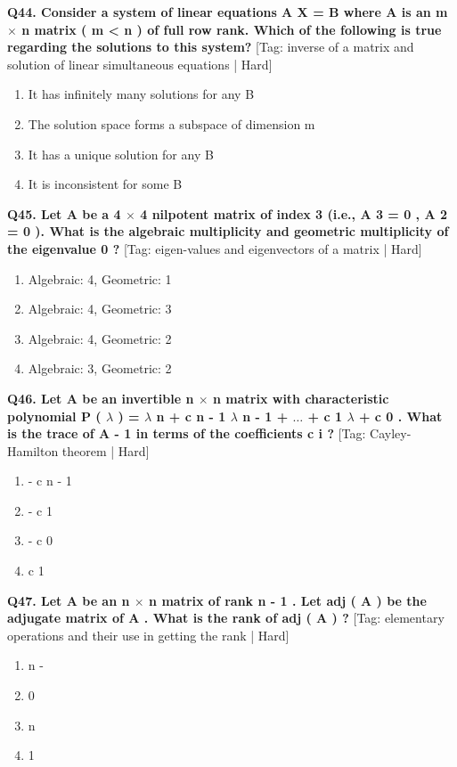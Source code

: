 \noindent\textbf{Q44. Consider a system of linear equations A X = B where A is an m $\times$ n matrix ( m < n ) of full row rank. Which of the following is true regarding the solutions to this system?} \hfill [Tag: inverse of a matrix and solution of linear simultaneous equations | Hard]
\begin{enumerate}[label=(\alph*),topsep=2pt,itemsep=1pt,partopsep=0pt,parsep=0pt]
    \item {{It has infinitely many solutions for any B}}
    \item {{The solution space forms a subspace of dimension m}}
    \item {{It has a unique solution for any B}}
    \item {{It is inconsistent for some B}}
\end{enumerate}
\vspace{2mm}

\noindent\textbf{Q45. Let A be a 4 $\times$ 4 nilpotent matrix of index 3 (i.e., A 3 = 0 , A 2  = 0 ). What is the algebraic multiplicity and geometric multiplicity of the eigenvalue 0 ?} \hfill [Tag: eigen-values and eigenvectors of a matrix | Hard]
\begin{enumerate}[label=(\alph*),topsep=2pt,itemsep=1pt,partopsep=0pt,parsep=0pt]
    \item {{Algebraic: 4, Geometric: 1}}
    \item {{Algebraic: 4, Geometric: 3}}
    \item {{Algebraic: 4, Geometric: 2}}
    \item {{Algebraic: 3, Geometric: 2}}
\end{enumerate}
\vspace{2mm}

\noindent\textbf{Q46. Let A be an invertible n $\times$ n matrix with characteristic polynomial P ( $\lambda$ ) = $\lambda$ n + c n - 1 $\lambda$ n - 1 + $\dots$ + c 1 $\lambda$ + c 0 . What is the trace of A - 1 in terms of the coefficients c i ?} \hfill [Tag: Cayley-Hamilton theorem | Hard]
\begin{enumerate}[label=(\alph*),topsep=2pt,itemsep=1pt,partopsep=0pt,parsep=0pt]
    \item {{- c n - 1}}
    \item {{- c 1}}
    \item {{- c 0}}
    \item {{c 1}}
\end{enumerate}
\vspace{2mm}

\noindent\textbf{Q47. Let A be an n $\times$ n matrix of rank n - 1 . Let adj ( A ) be the adjugate matrix of A . What is the rank of adj ( A ) ?} \hfill [Tag: elementary operations and their use in getting the rank | Hard]
\begin{enumerate}[label=(\alph*),topsep=2pt,itemsep=1pt,partopsep=0pt,parsep=0pt]
    \item {{n -}}
    \item {{0}}
    \item {{n}}
    \item {{1}}
\end{enumerate}
\vspace{2mm}

